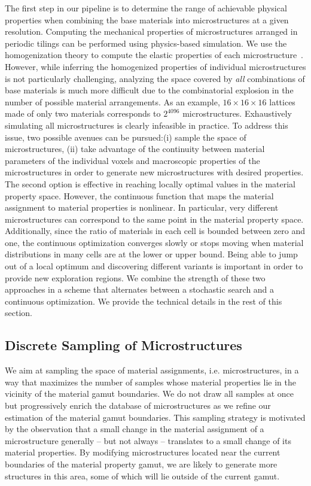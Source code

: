 The first step in our pipeline is to determine the range of achievable physical properties when combining the base materials into microstructures at a given resolution.
Computing the mechanical properties of microstructures arranged in periodic tilings can be performed using physics-based simulation.
We use the homogenization theory to compute the elastic properties of each microstructure~\cite{Allaire2012,Schumacher:2015,Panetta:2015}.
However, while inferring the homogenized properties of individual microstructures is not particularly challenging, analyzing the space covered by {\it all} combinations of base materials is much more difficult due to the combinatorial explosion in the number of possible material arrangements.
As an example, $16\times16\times16$ lattices made of only two materials corresponds to $2^{4096}$ microstructures.
Exhaustively simulating all microstructures is clearly infeasible in practice.
To address this issue, two possible avenues can be pursued:(i) sample the space of microstructures, (ii) take advantage of the continuity between material parameters of the individual voxels and macroscopic properties of the microstructures in order to generate new microstructures with desired properties.
The second option is effective in reaching locally optimal values in the material property space.
However, the continuous function that maps the material assignment to material properties is nonlinear.
In particular, very different microstructures can correspond to the same point in the material property space.
Additionally, since the ratio of materials in each cell is bounded between zero and one, the continuous optimization converges slowly or stops moving when material distributions in many cells are at the lower or upper bound.
Being able to jump out of a local optimum and discovering different variants is important in order to provide new exploration regions.
We combine the strength of these two approaches in a scheme that alternates between a stochastic search and a continuous optimization. We provide the technical details in the rest of this section.

\subsection{Discrete Sampling of Microstructures}
We aim at sampling the space of material assignments, i.e. microstructures, in a way that maximizes the number of samples whose material properties lie in the vicinity of the material gamut boundaries.
We do not draw all samples at once but progressively enrich the database of microstructures as we refine our estimation of the material gamut boundaries.
This sampling strategy is motivated by the observation that a small change in the material assignment of a microstructure generally -- but not always -- translates to a small change of its material properties.
By modifying microstructures located near the current boundaries of the material property gamut, we are likely to generate more structures in this area, some of which will lie outside of the current gamut.

